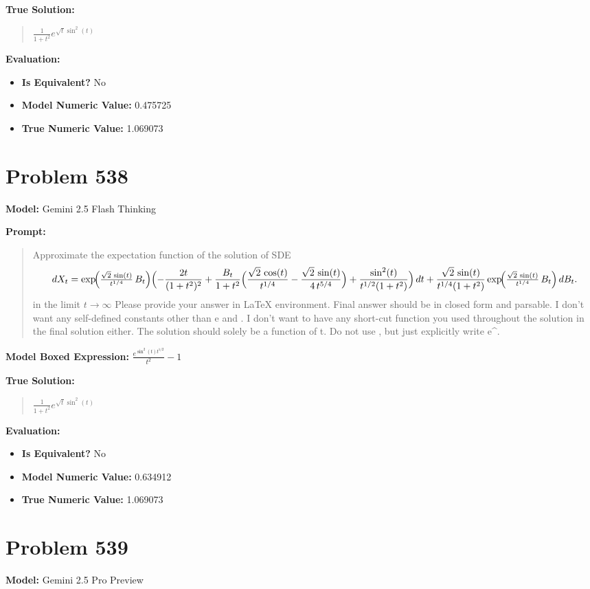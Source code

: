 \documentclass{article}
\begin{document}
\textbf{True Solution:}
\begin{quote}
$\frac{1}{1 + t^2} e^{\sqrt{t} \sin^2(t)}$
\end{quote}

\textbf{Evaluation:}
\begin{itemize}
\item \textbf{Is Equivalent?} No
\item \textbf{Model Numeric Value:} 0.475725
\item \textbf{True Numeric Value:} 1.069073
\end{itemize}
\vspace{1cm}
\section*{Problem 538}
\textbf{Model:} Gemini 2.5 Flash Thinking

\textbf{Prompt:}
\begin{quote}
Approximate the expectation function of the solution of SDE $$dX_t =\exp\!\Bigl(\tfrac{\sqrt2\,\sin(t)}{t^{1/4}}\,B_t\Bigr)\Bigl(-\frac{2t}{(1+t^2)^2}+\frac{B_t}{1+t^2}\Bigl(\frac{\sqrt2\,\cos(t)}{t^{1/4}}-\frac{\sqrt2\,\sin(t)}{4\,t^{5/4}}\Bigr)+\frac{\sin^2(t)}{t^{1/2}(1+t^2)}\Bigr)\,dt+\frac{\sqrt2\,\sin(t)}{t^{1/4}(1+t^2)}\exp\!\Bigl(\tfrac{\sqrt2\,\sin(t)}{t^{1/4}}\,B_t\Bigr)\,dB_t.$$ in the limit $t \to \infty$ Please provide your answer in LaTeX \boxed{} environment. Final answer should be in closed form and parsable. I don't want any self-defined constants other than e and \pi. I don't want to have any short-cut function you used throughout the solution in the final solution either. The solution should solely be a function of t. Do not use \exp, but just explicitly write e^.
\end{quote}
\textbf{Model Boxed Expression:} $\frac{e^{\sin^2(t) t^{1/2}}}{t^2} - 1$

\textbf{True Solution:}
\begin{quote}
$\frac{1}{1 + t^2} e^{\sqrt{t} \sin^2(t)}$
\end{quote}

\textbf{Evaluation:}
\begin{itemize}
\item \textbf{Is Equivalent?} No
\item \textbf{Model Numeric Value:} 0.634912
\item \textbf{True Numeric Value:} 1.069073
\end{itemize}
\vspace{1cm}
\section*{Problem 539}
\textbf{Model:} Gemini 2.5 Pro Preview
\end{document}
